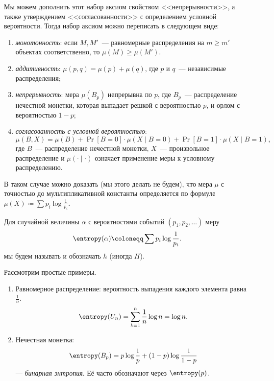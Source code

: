 Мы можем дополнить этот набор аксиом свойством <<непрерывности>>, а также утверждением
<<согласованности>> с определением условной вероятности. Тогда набор аксиом можно переписать в следующем
виде:
\begin{enumerate}
    \item \textit{монотонность}: если $M, M'$~--- равномерные распределения на $m \geq m'$ объектах
        соответственно, то $\mu(M) \geq \mu(M')$.
    \item \textit{аддитивность}: $\mu(p, q) = \mu(p) + \mu(q)$, где $p$ и $q$~--- независимые
        распределения;
    \item \textit{непрерывность}: мера $\mu(B_p)$ непрерывна по $p$, где $B_p$~--- распределение
        нечестной монетки, которая выпадает решкой с вероятностью $p$, и орлом с вероятностью $1 - p$;
    \item \textit{согласованность с условной вероятностью}:
        $$
            \mu(B, X) = \mu(B) + \Pr[B = 0] \cdot \mu(X \mid B = 0) + \Pr[B = 1] \cdot \mu(X \mid B = 1),
        $$
        где $B$~--- распределение нечестной монетки, $X$~--- произвольное распределение и $\mu(\cdot
        \mid \cdot)$ означает применение меры к условному распределению.
\end{enumerate}

В таком случае можно доказать (мы этого делать не будем), что мера $\mu$ с точностью до мультипликативной
константы определяется по формуле $\mu(X) \coloneqq \sum p_i \log \frac{1}{p_i}$.

\begin{definition}
    Для случайной величины $\alpha$ с вероятностями событий $(p_1, p_2, \dots)$ меру
    $$
        \entropy(\alpha) \coloneqq \sum p_i \log \frac{1}{p_i}.
    $$
    мы будем называть  и обозначать $h$ (иногда $H$).
\end{definition}

Рассмотрим простые примеры.

\begin{enumerate}
    \item Равномерное распределение: вероятность выпадения каждого элемента равна $\frac{1}{n}$.
        $$
            \entropy(U_n) = \sum_{k = 1}^n \frac{1}{n} \log n = \log n.
        $$
    \item Нечестная монетка:
        $$
            \entropy(B_p) = p \log \frac{1}{p} + (1 - p) \log \frac{1}{1 - p}
        $$
        --- \textit{бинарная энтропия}. Её часто обозначают через $\entropy(p)$.
\end{enumerate}


